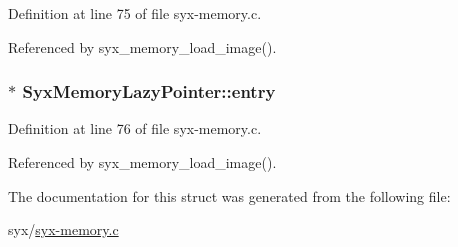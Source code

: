 Definition at line 75 of file syx-memory.c.

Referenced by syx\_\-memory\_\-load\_\-image().\hypertarget{struct_syx_memory_lazy_pointer_70f1d25b762e6ec483c070872d3cd1bb}{
\subsubsection{$\ast$ {\bf SyxMemoryLazyPointer::entry}}}
\label{struct_syx_memory_lazy_pointer_70f1d25b762e6ec483c070872d3cd1bb}




Definition at line 76 of file syx-memory.c.

Referenced by syx\_\-memory\_\-load\_\-image().

The documentation for this struct was generated from the following file:\begin{CompactItemize}
\item 
syx/\hyperlink{syx-memory_8c}{syx-memory.c}\end{CompactItemize}
